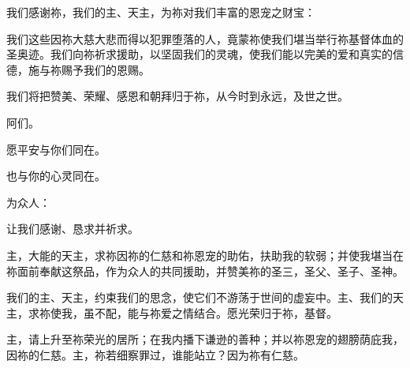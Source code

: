 \par

我们感谢祢，我们的主、天主，为祢对我们丰富的恩宠之财宝：\par

\par

我们这些因祢大慈大悲而得以犯罪堕落的人，竟蒙祢使我们堪当举行祢基督体血的圣奥迹。我们向祢祈求援助，以坚固我们的灵魂，使我们能以完美的爱和真实的信德，施与祢赐予我们的恩赐。\par

\par

我们将把赞美、荣耀、感恩和朝拜归于祢，从今时到永远，及世之世。\par

\par

阿们。\par

\par

愿平安与你们同在。\par

\par

也与你的心灵同在。\par

\par

为众人：\par

\par

让我们感谢、恳求并祈求。\par

\par

主，大能的天主，求祢因祢的仁慈和祢恩宠的助佑，扶助我的软弱；并使我堪当在祢面前奉献这祭品，作为众人的共同援助，并赞美祢的圣三，圣父、圣子、圣神。\par

\par

我们的主、天主，约束我们的思念，使它们不游荡于世间的虚妄中。主、我们的天主，求祢使我，虽不配，能与祢爱之情结合。愿光荣归于祢，基督。\par

主，请上升至祢荣光的居所；在我内播下谦逊的善种；并以祢恩宠的翅膀荫庇我，因祢的仁慈。主，祢若细察罪过，谁能站立？因为祢有仁慈。\par


